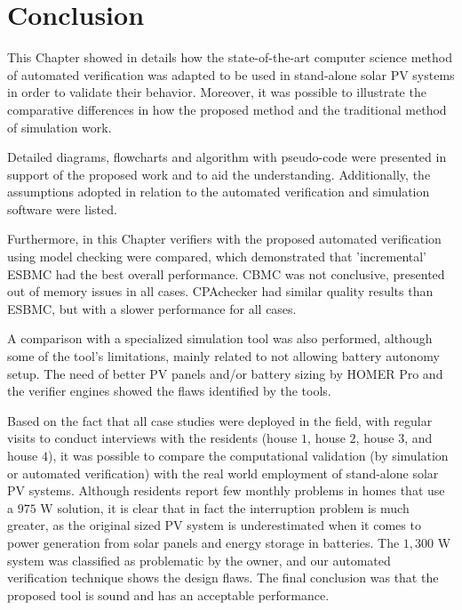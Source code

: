 \section{Conclusion}

This Chapter showed in details how the state-of-the-art computer science method of automated verification was adapted to be used in stand-alone solar PV systems in order to validate their behavior. Moreover, it was possible to illustrate the comparative differences in how the proposed method and the traditional method of simulation work.

Detailed diagrams, flowcharts and algorithm with pseudo-code were presented in support of the proposed work and to aid the understanding. Additionally, the assumptions adopted in relation to the automated verification and simulation software were listed.

Furthermore, in this Chapter verifiers with the proposed automated verification using model checking were compared, which demonstrated that 'incremental' ESBMC had the best overall performance. CBMC was not conclusive, presented out of memory issues in all cases. CPAchecker had similar quality results than ESBMC, but with a slower performance for all cases.

A comparison with a specialized simulation tool was also performed, although some of the tool's limitations, mainly related to not allowing battery autonomy setup.  The need of better PV panels and/or battery sizing by HOMER Pro and the verifier engines showed the flaws identified by the tools.

Based on the fact that all case studies were deployed in the field, with regular visits to conduct interviews with the residents (house $1$, house $2$, house $3$, and house $4$), it was possible to compare the computational validation (by simulation or automated verification) with the real world employment of stand-alone solar PV systems. Although residents report few monthly problems in homes that use a $975$ W solution, it is clear that in fact the interruption problem is much greater, as the original sized PV system is underestimated when it comes to power generation from solar panels and energy storage in batteries. The $1,300$ W system was classified as problematic by the owner, and our automated verification technique shows the design flaws. The final conclusion was that the proposed tool is sound and has an acceptable performance. 
